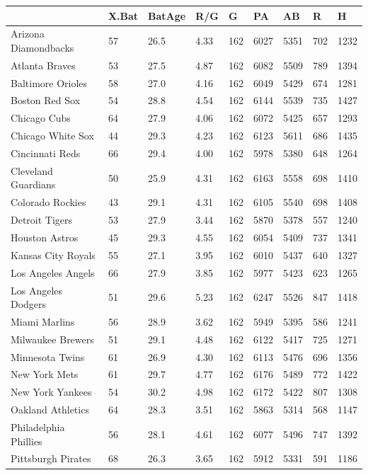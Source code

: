 \documentclass[
  11pt,
]{book}
\theoremstyle{definition}
\theoremstyle{definition}
\theoremstyle{definition}
\theoremstyle{definition}
\theoremstyle{remark}
\begin{document}
\begin{tabular}{lllllllll}
\toprule
  & X.Bat & BatAge & R/G & G & PA & AB & R & H\\
\midrule
Arizona Diamondbacks & 57 & 26.5 & 4.33 & 162 & 6027 & 5351 & 702 & 1232\\
Atlanta Braves & 53 & 27.5 & 4.87 & 162 & 6082 & 5509 & 789 & 1394\\
Baltimore Orioles & 58 & 27.0 & 4.16 & 162 & 6049 & 5429 & 674 & 1281\\
Boston Red Sox & 54 & 28.8 & 4.54 & 162 & 6144 & 5539 & 735 & 1427\\
Chicago Cubs & 64 & 27.9 & 4.06 & 162 & 6072 & 5425 & 657 & 1293\\
\addlinespace
Chicago White Sox & 44 & 29.3 & 4.23 & 162 & 6123 & 5611 & 686 & 1435\\
Cincinnati Reds & 66 & 29.4 & 4.00 & 162 & 5978 & 5380 & 648 & 1264\\
Cleveland Guardians & 50 & 25.9 & 4.31 & 162 & 6163 & 5558 & 698 & 1410\\
Colorado Rockies & 43 & 29.1 & 4.31 & 162 & 6105 & 5540 & 698 & 1408\\
Detroit Tigers & 53 & 27.9 & 3.44 & 162 & 5870 & 5378 & 557 & 1240\\
\addlinespace
Houston Astros & 45 & 29.3 & 4.55 & 162 & 6054 & 5409 & 737 & 1341\\
Kansas City Royals & 55 & 27.1 & 3.95 & 162 & 6010 & 5437 & 640 & 1327\\
Los Angeles Angels & 66 & 27.9 & 3.85 & 162 & 5977 & 5423 & 623 & 1265\\
Los Angeles Dodgers & 51 & 29.6 & 5.23 & 162 & 6247 & 5526 & 847 & 1418\\
Miami Marlins & 56 & 28.9 & 3.62 & 162 & 5949 & 5395 & 586 & 1241\\
\addlinespace
Milwaukee Brewers & 51 & 29.1 & 4.48 & 162 & 6122 & 5417 & 725 & 1271\\
Minnesota Twins & 61 & 26.9 & 4.30 & 162 & 6113 & 5476 & 696 & 1356\\
New York Mets & 61 & 29.7 & 4.77 & 162 & 6176 & 5489 & 772 & 1422\\
New York Yankees & 54 & 30.2 & 4.98 & 162 & 6172 & 5422 & 807 & 1308\\
Oakland Athletics & 64 & 28.3 & 3.51 & 162 & 5863 & 5314 & 568 & 1147\\
\addlinespace
Philadelphia Phillies & 56 & 28.1 & 4.61 & 162 & 6077 & 5496 & 747 & 1392\\
Pittsburgh Pirates & 68 & 26.3 & 3.65 & 162 & 5912 & 5331 & 591 & 1186\\

\end{tabular}
\end{document}
